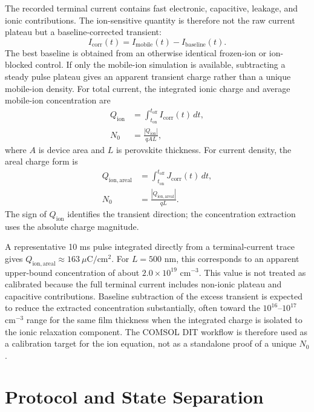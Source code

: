 The recorded terminal current contains fast electronic, capacitive, leakage,
and ionic contributions. The ion-sensitive quantity is therefore not the raw
current plateau but a baseline-corrected transient:
\begin{equation}
I_{\mathrm{corr}}(t)
=I_{\mathrm{mobile}}(t)-I_{\mathrm{baseline}}(t).
\end{equation}
The best baseline is obtained from an otherwise identical frozen-ion or
ion-blocked control. If only the mobile-ion simulation is available, subtracting
a steady pulse plateau gives an apparent transient charge rather than a unique
mobile-ion density. For total current, the integrated ionic charge and average
mobile-ion concentration are
\begin{align}
Q_{\mathrm{ion}} &=\int_{t_{\mathrm{on}}}^{t_{\mathrm{off}}}
I_{\mathrm{corr}}(t)\,dt,\\
N_0 &=\frac{|Q_{\mathrm{ion}}|}{qAL},
\end{align}
where $A$ is device area and $L$ is perovskite thickness. For current density,
the areal charge form is
\begin{align}
Q_{\mathrm{ion,areal}} &=\int_{t_{\mathrm{on}}}^{t_{\mathrm{off}}}
J_{\mathrm{corr}}(t)\,dt,\\
N_0 &=\frac{|Q_{\mathrm{ion,areal}}|}{qL}.
\end{align}
The sign of $Q_{\mathrm{ion}}$ identifies the transient direction; the
concentration extraction uses the absolute charge magnitude.

A representative 10 ms pulse integrated directly from a terminal-current
trace gives $Q_{\mathrm{ion,areal}}\approx163~\mu\mathrm{C/cm^2}$. For
$L=500$ nm, this corresponds to an apparent upper-bound concentration of about
$2.0\times10^{19}$ cm$^{-3}$. This value is not treated as calibrated because
the full terminal current includes non-ionic plateau and capacitive
contributions. Baseline subtraction of the excess transient is expected to
reduce the extracted concentration substantially, often toward the
$10^{16}$--$10^{17}$ cm$^{-3}$ range for the same film thickness when the
integrated charge is isolated to the ionic relaxation component. The COMSOL
DIT workflow is therefore used as a calibration target for the ion equation,
not as a standalone proof of a unique $N_0$.

\section{Protocol and State Separation}

